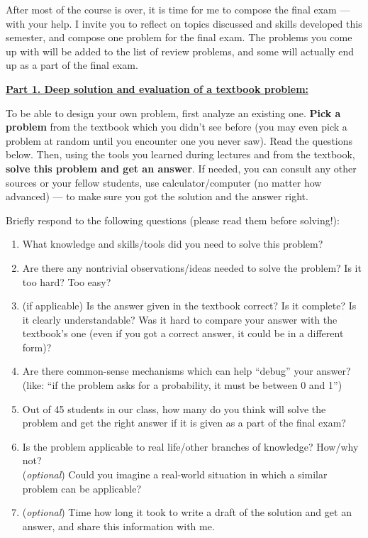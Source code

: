 \documentclass[oneside,11pt]{amsart}
\newcommand{\razdel}[1]{\smallskip\underline{\textbf{#1:}}\smallskip}
\begin{document}
\medskip

After most of the course is over, it is time for me to 
compose the final exam --- with your help.
I invite you to reflect on topics discussed and skills developed this semester, 
and compose one problem for the final exam. The problems you come up with 
will be added to the list of review problems, 
and some will actually end up as a part of the final exam.

\razdel{Part 1. Deep solution and evaluation of a textbook problem}

To be able to design your own problem, first 
analyze an existing one. 
\textbf{Pick a problem} from the textbook which you didn't see before 
(you may even pick a problem at random until you encounter one you never saw).
Read the questions below. Then,
using the tools you learned during lectures and 
from the textbook, \textbf{solve this problem and get an answer}.
If needed, you can consult any other sources
or your fellow students, 
use calculator/computer (no matter how advanced) ---
to make sure you got the solution and the answer right.

Briefly respond to the following questions (please read them before solving!):

\begin{enumerate}[\bf{}1.]
	\item What knowledge and skills/tools did you need to solve this problem?
	\item Are there any nontrivial observations/ideas needed to solve the problem? Is it too hard? Too easy?
	\item (if applicable) Is the answer given in the textbook correct? Is it complete? Is it clearly understandable? Was it hard to compare your answer with the textbook's one (even if 
	you got a correct answer, it could be in a different form)?
	\item Are there common-sense mechanisms which can help ``debug'' your answer?
	(like: ``if the problem asks for a probability, it must be between 0 and 1'')
	\item Out of 45 students in our class, how many do you think will solve the problem and get the right answer if it is given as a part of the final
	exam?
	\item Is the problem applicable to real life/other branches of knowledge? How/why not?\\
	(\emph{optional}) Could you imagine a real-world situation in which a similar problem can be applicable?
	\item (\emph{optional})
	Time 
	how long it took to write a draft of the solution 
	and get an answer, and share this information with me.
\end{enumerate}
\end{document}
